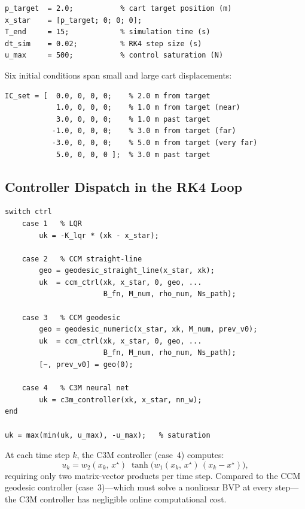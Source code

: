 \documentclass[11pt,a4paper]{article}
\begin{document}
\begin{lstlisting}
p_target  = 2.0;           % cart target position (m)
x_star    = [p_target; 0; 0; 0];
T_end     = 15;            % simulation time (s)
dt_sim    = 0.02;          % RK4 step size (s)
u_max     = 500;           % control saturation (N)
\end{lstlisting}

Six initial conditions span small and large cart displacements:

\begin{lstlisting}
IC_set = [  0.0, 0, 0, 0;    % 2.0 m from target
            1.0, 0, 0, 0;    % 1.0 m from target (near)
            3.0, 0, 0, 0;    % 1.0 m past target
           -1.0, 0, 0, 0;    % 3.0 m from target (far)
           -3.0, 0, 0, 0;    % 5.0 m from target (very far)
            5.0, 0, 0, 0 ];  % 3.0 m past target
\end{lstlisting}

\subsection{Controller Dispatch in the RK4 Loop}

\begin{lstlisting}
switch ctrl
    case 1   % LQR
        uk = -K_lqr * (xk - x_star);

    case 2   % CCM straight-line
        geo = geodesic_straight_line(x_star, xk);
        uk  = ccm_ctrl(xk, x_star, 0, geo, ...
                       B_fn, M_num, rho_num, Ns_path);

    case 3   % CCM geodesic
        geo = geodesic_numeric(x_star, xk, M_num, prev_v0);
        uk  = ccm_ctrl(xk, x_star, 0, geo, ...
                       B_fn, M_num, rho_num, Ns_path);
        [~, prev_v0] = geo(0);

    case 4   % C3M neural net
        uk = c3m_controller(xk, x_star, nn_w);
end

uk = max(min(uk, u_max), -u_max);   % saturation
\end{lstlisting}

\begin{codemath}
At each time step \(k\), the C3M controller (case~4) computes:
\[
u_k = w_2(x_k,\,x^\star)\;\tanh\!\bigl(w_1(x_k,\,x^\star)\,(x_k - x^\star)\bigr),
\]
requiring only two matrix-vector products per time step. Compared to the CCM geodesic controller (case~3)---which must solve a nonlinear BVP at every step---the C3M controller has negligible online computational cost.
\end{codemath}
\end{document}
